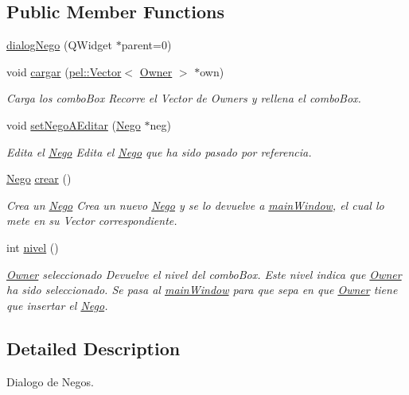 \subsection*{Public Member Functions}
\begin{DoxyCompactItemize}
\item 
\hyperlink{classdialogNego_ab093ca8a15c030021d87c540bc5d4da1}{dialog\+Nego} (Q\+Widget $\ast$parent=0)
\item 
void \hyperlink{classdialogNego_a6d97c6b5dcaa5ce2dc283ef4c1514257}{cargar} (\hyperlink{classpel_1_1Vector}{pel\+::\+Vector}$<$ \hyperlink{classOwner}{Owner} $>$ $\ast$own)
\begin{DoxyCompactList}\small\item\em Carga los combo\+Box Recorre el Vector de Owners y rellena el combo\+Box. \end{DoxyCompactList}\item 
void \hyperlink{classdialogNego_a658d77039ffbb8874e8d25af7b00f489}{set\+Nego\+A\+Editar} (\hyperlink{classNego}{Nego} $\ast$neg)
\begin{DoxyCompactList}\small\item\em Edita el \hyperlink{classNego}{Nego} Edita el \hyperlink{classNego}{Nego} que ha sido pasado por referencia. \end{DoxyCompactList}\item 
\hyperlink{classNego}{Nego} \hyperlink{classdialogNego_a525e03d9c16ab7fd99c0bb2476a89b85}{crear} ()
\begin{DoxyCompactList}\small\item\em Crea un \hyperlink{classNego}{Nego} Crea un nuevo \hyperlink{classNego}{Nego} y se lo devuelve a \hyperlink{classmainWindow}{main\+Window}, el cual lo mete en su Vector correspondiente. \end{DoxyCompactList}\item 
int \hyperlink{classdialogNego_a3286fa0d71e65d2b7863d9c32a4787f3}{nivel} ()
\begin{DoxyCompactList}\small\item\em \hyperlink{classOwner}{Owner} seleccionado Devuelve el nivel del combo\+Box. Este nivel indica que \hyperlink{classOwner}{Owner} ha sido seleccionado. Se pasa al \hyperlink{classmainWindow}{main\+Window} para que sepa en que \hyperlink{classOwner}{Owner} tiene que insertar el \hyperlink{classNego}{Nego}. \end{DoxyCompactList}\end{DoxyCompactItemize}


\subsection{Detailed Description}
Dialogo de Negos. 

